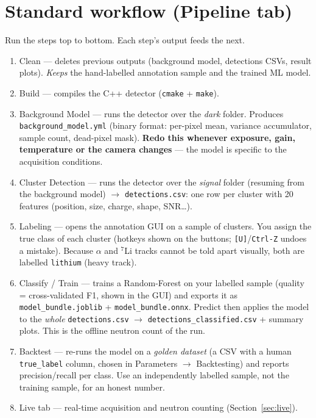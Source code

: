 \documentclass[11pt,a4paper]{article}
\newcommand{\gui}[1]{\textsf{#1}}
\begin{document}
\section{Standard workflow (Pipeline tab)}
Run the steps top to bottom. Each step's output feeds the next.
\begin{enumerate}
  \item \gui{Clean} --- deletes previous outputs (background model,
        detections CSVs, result plots). \emph{Keeps} the hand-labelled
        annotation sample and the trained ML model.
  \item \gui{Build} --- compiles the C++ detector (\texttt{cmake} + \texttt{make}).
  \item \gui{Background Model} --- runs the detector over the \emph{dark}
        folder. Produces \texttt{background\_model.yml} (binary format:
        per-pixel mean, variance accumulator, sample count, dead-pixel mask).
        \textbf{Redo this whenever exposure, gain, temperature or the camera
        changes} --- the model is specific to the acquisition conditions.
  \item \gui{Cluster Detection} --- runs the detector over the \emph{signal}
        folder (resuming from the background model) $\rightarrow$
        \texttt{detections.csv}: one row per cluster with 20 features
        (position, size, charge, shape, SNR\ldots).
  \item \gui{Labeling} --- opens the annotation GUI on a sample of clusters.
        You assign the true class of each cluster (hotkeys shown on the
        buttons; \texttt{[U]}/\texttt{Ctrl-Z} undoes a mistake). Because
        $\alpha$ and $^{7}$Li tracks cannot be told apart visually, both are
        labelled \texttt{lithium} (heavy track).
  \item \gui{Classify / Train} --- trains a Random-Forest on your labelled
        sample (quality = cross-validated F1, shown in the GUI) and exports
        it as \texttt{model\_bundle.joblib} + \texttt{model\_bundle.onnx}.
        \gui{Predict} then applies the model to the \emph{whole}
        \texttt{detections.csv} $\rightarrow$
        \texttt{detections\_classified.csv} + summary plots. This is the
        offline neutron count of the run.
  \item \gui{Backtest} --- re-runs the model on a \emph{golden dataset} (a
        CSV with a human \texttt{true\_label} column, chosen in
        \gui{Parameters} $\rightarrow$ \gui{Backtesting}) and reports
        precision/recall per class. Use an independently labelled sample,
        not the training sample, for an honest number.
  \item \gui{Live} tab --- real-time acquisition and neutron counting
        (Section~\ref{sec:live}).
\end{enumerate}
\end{document}
